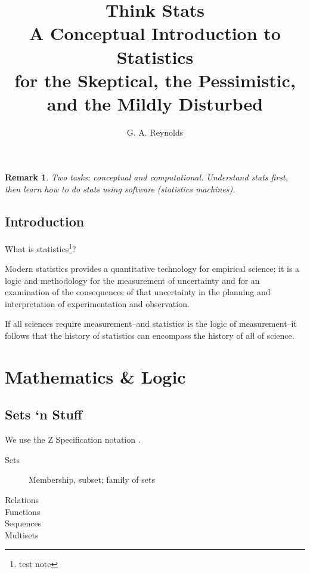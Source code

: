 \documentclass[reqno,12pt]{tufte-book}
\title{Think Stats \\
\vspace{12pt}
\Large A Conceptual Introduction to Statistics \\
\vspace{12pt}
\large for the Skeptical, the Pessimistic, and the Mildly Disturbed}
\author{G. A. Reynolds}
\numberwithin{equation}{subsection}
\newtheorem{remark}{Remark}
\begin{document}
\maketitle

\begin{remark}
  Two tasks: conceptual and computational.  Understand stats first,
  then learn how to \emph{do} stats using software (statistics
  machines).
\end{remark}

\tableofcontents

\chapter{Introduction}

What is statistics\footnote{test note}?

\epigraph{Modern statistics provides a quantitative technology for
  empirical science; it is a logic and methodology for the measurement
  of uncertainty and for an examination of the consequences of that
  uncertainty in the planning and interpretation of experimentation
  and observation.}{\citet{stigler_history_1986}}

\epigraph{If all sciences require measurement--and statistics is the
  logic of measurement--it follows that the history of statistics can
  encompass the history of all of
  science.}{\citet{stigler_history_1986}}


\part{Mathematics \& Logic}

\chapter{Sets `n Stuff}

We use the Z Specification notation \cite{z-iso-13568}.

\begin{description}
\item [Sets] Membership, subset; family of sets
\item [Relations]
\item [Functions]
\item [Sequences]
\item [Multisets]
\end{description}
\end{document}
